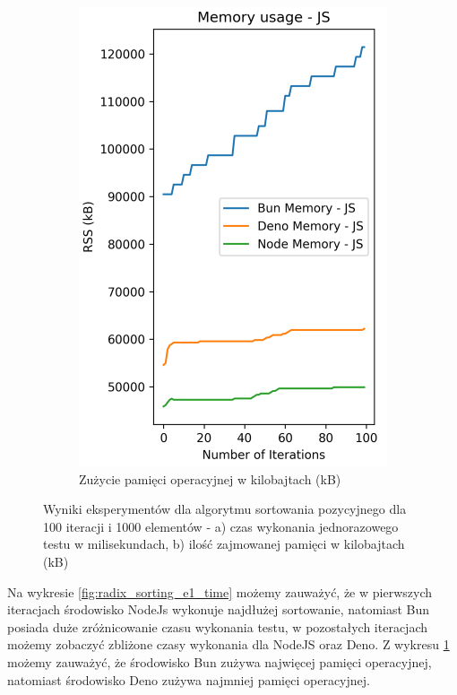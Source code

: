 \begin{figure}[H]
\begin{subfigure}[b]{0.44\textwidth}
    \includegraphics[width=\textwidth]{Figures/sorting/sorting_radix_100_1000_js_memory.png}
    \caption{Zużycie pamięci operacyjnej w kilobajtach (kB)}
    \label{fig:radix_sorting_e1_memory}
  \end{subfigure}
  \caption{Wyniki eksperymentów dla algorytmu sortowania pozycyjnego dla 100 iteracji i 1000 elementów - a) czas wykonania jednorazowego testu w milisekundach, b) ilość zajmowanej pamięci w kilobajtach (kB)}
  \label{fig:radix_sorting_e1}
\end{figure}

Na wykresie \ref{fig:radix_sorting_e1_time} możemy zauważyć, że w pierwszych iteracjach środowisko NodeJs wykonuje najdłużej sortowanie, natomiast Bun posiada duże zróżnicowanie czasu wykonania testu, w pozostałych iteracjach możemy zobaczyć zbliżone czasy wykonania dla NodeJS oraz Deno. Z wykresu \ref{fig:radix_sorting_e1_memory} możemy zauważyć, że środowisko Bun zużywa najwięcej pamięci operacyjnej, natomiast środowisko Deno zużywa najmniej pamięci operacyjnej.

